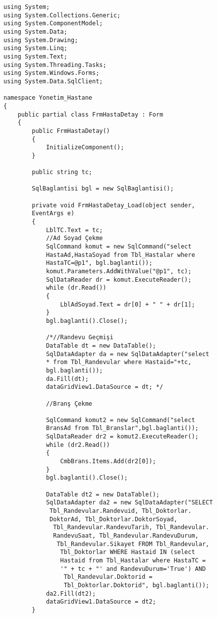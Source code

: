 \begin{lstlisting}
using System;
using System.Collections.Generic;
using System.ComponentModel;
using System.Data;
using System.Drawing;
using System.Linq;
using System.Text;
using System.Threading.Tasks;
using System.Windows.Forms;
using System.Data.SqlClient;

namespace Yonetim_Hastane
{
    public partial class FrmHastaDetay : Form
    {
        public FrmHastaDetay()
        {
            InitializeComponent();
        }

        public string tc;

        SqlBaglantisi bgl = new SqlBaglantisi();

        private void FrmHastaDetay_Load(object sender, 
        EventArgs e)
        {
            LblTC.Text = tc;
            //Ad Soyad Çekme
            SqlCommand komut = new SqlCommand("select 
            HastaAd,HastaSoyad from Tbl_Hastalar where 
            HastaTC=@p1", bgl.baglanti());
            komut.Parameters.AddWithValue("@p1", tc);
            SqlDataReader dr = komut.ExecuteReader();
            while (dr.Read())
            {
                LblAdSoyad.Text = dr[0] + " " + dr[1];
            }
            bgl.baglanti().Close();

            /*//Randevu Geçmişi
            DataTable dt = new DataTable();
            SqlDataAdapter da = new SqlDataAdapter("select 
            * from Tbl_Randevular where Hastaid="+tc,
            bgl.baglanti());
            da.Fill(dt);
            dataGridView1.DataSource = dt; */

            //Branş Çekme

            SqlCommand komut2 = new SqlCommand("select 
            BransAd from Tbl_Branslar",bgl.baglanti());
            SqlDataReader dr2 = komut2.ExecuteReader();
            while (dr2.Read())
            {
                CmbBrans.Items.Add(dr2[0]);
            }
            bgl.baglanti().Close();

            DataTable dt2 = new DataTable();
            SqlDataAdapter da2 = new SqlDataAdapter("SELECT
             Tbl_Randevular.Randevuid, Tbl_Doktorlar.
             DoktorAd, Tbl_Doktorlar.DoktorSoyad,
              Tbl_Randevular.RandevuTarih, Tbl_Randevular.
              RandevuSaat, Tbl_Randevular.RandevuDurum,
               Tbl_Randevular.Sikayet FROM Tbl_Randevular,
                Tbl_Doktorlar WHERE Hastaid IN (select 
                Hastaid from Tbl_Hastalar where HastaTC = 
                '" + tc + "' and RandevuDurum='True') AND
                 Tbl_Randevular.Doktorid = 
                 Tbl_Doktorlar.Doktorid", bgl.baglanti());
            da2.Fill(dt2);
            dataGridView1.DataSource = dt2;
        }


\end{lstlisting}
